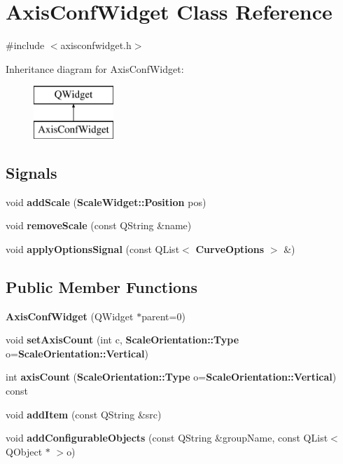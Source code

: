 \section{Axis\+Conf\+Widget Class Reference}
\label{classAxisConfWidget}


{\ttfamily \#include $<$axisconfwidget.\+h$>$}

Inheritance diagram for Axis\+Conf\+Widget\+:\begin{figure}[H]
\begin{center}
\leavevmode
\includegraphics[height=2.000000cm]{classAxisConfWidget}
\end{center}
\end{figure}
\subsection*{Signals}
\begin{DoxyCompactItemize}
\item 
void {\bf add\+Scale} ({\bf Scale\+Widget\+::\+Position} pos)
\item 
void {\bf remove\+Scale} (const Q\+String \&name)
\item 
void {\bf apply\+Options\+Signal} (const Q\+List$<$ {\bf Curve\+Options} $>$ \&)
\end{DoxyCompactItemize}
\subsection*{Public Member Functions}
\begin{DoxyCompactItemize}
\item 
{\bf Axis\+Conf\+Widget} (Q\+Widget $\ast$parent=0)
\item 
void {\bf set\+Axis\+Count} (int c, {\bf Scale\+Orientation\+::\+Type} o={\bf Scale\+Orientation\+::\+Vertical})
\item 
int {\bf axis\+Count} ({\bf Scale\+Orientation\+::\+Type} o={\bf Scale\+Orientation\+::\+Vertical}) const 
\item 
void {\bf add\+Item} (const Q\+String \&src)
\item 
void {\bf add\+Configurable\+Objects} (const Q\+String \&group\+Name, const Q\+List$<$ Q\+Object $\ast$ $>$o)
\end{DoxyCompactItemize}


